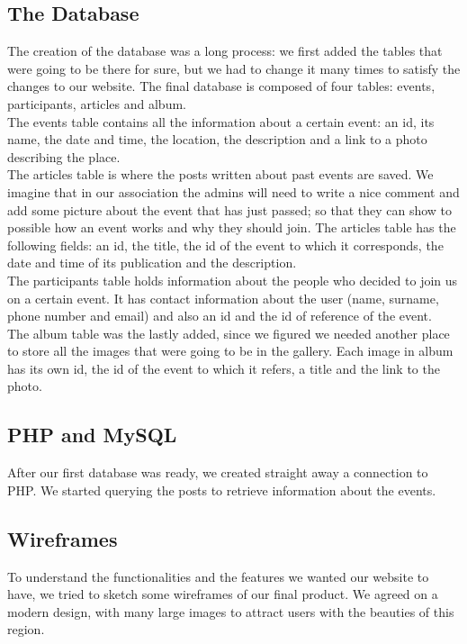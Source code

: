 \documentclass[a4paper]{article}
\begin{document}
	\subsection{The Database}
	The creation of the database was a long process: we first added the tables that were going to be there for sure, but we had to change it many times to satisfy the changes to our website. The final database is composed of four tables: events, participants, articles and album.\\
	The events table contains all the information about a certain event: an id, its name, the date and time, the location, the description and a link to a photo describing the place.\\
	The articles table is where the posts written about past events are saved. We imagine that in our association the admins will need to write a nice comment and add some picture about the event that has just passed; so that they can show to possible how an event works and why they should join. The articles table has the following fields: an id, the title, the id of the event to which it corresponds, the date and time of its publication and the description.\\
	The participants table holds information about the people who decided to join us on a certain event. It has contact information about the user (name, surname, phone number and email) and also an id and the id of reference of the event.\\
	The album table was the lastly added, since we figured we needed another place to store all the images that were going to be in the gallery. Each image in album has its own id, the id of the event to which it refers, a title and the link to the photo.
	
	\subsection{PHP and MySQL}
	After our first database was ready, we created straight away a connection to PHP. We started querying the posts to retrieve information about the events.
	
	\subsection{Wireframes}
	To understand the functionalities and the features we wanted our website to have, we tried to sketch some wireframes of our final product. We agreed on a modern design, with many large images to attract users with the beauties of this region. 
	
\end{document}
